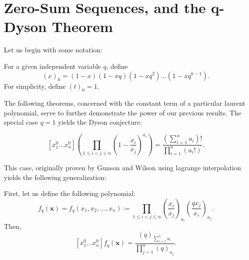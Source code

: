 \section{Zero-Sum Sequences, and the q-Dyson Theorem}
Let us begin with some notation:
\begin{notation}[Subpower]
	For a given independent variable $q$, define \[
		\left( x \right) _{k} = \left( 1-x \right) \left(  1-xq \right) \left( 1-xq^2 \right) \ldots \left( 1-xq^{k-1} \right)
	.\] 	For simplicity, define $\left( t \right) _{0} = 1$.
\end{notation}
The following theorems, concerned with the constant term of a particular laurent polynomial, serve to further demonstrate the power of our previous results. The special case $q=1$ yields the Dyson conjecture:
\begin{theorem}
	\[
		[x_1^{0}\ldots x_{n}^{0}]\left( \prod_{1\le i < j \le n}^{}  \left( 1- \frac{x_{i}}{x_{j}} \right)^{a_{i}}  \right)  = \frac{\left( \sum_{i= 1}^{n} a_{i} \right) ! }{\prod_{i= 1}^{n} \left( a_{i}! \right)}
	.\]
\end{theorem}
This case, originally proven by Gunson and Wilson using lagrange interpolation yields the following generalization:
\begin{theorem}
	First, let us define the following polynomial:
	\[
		f_{q}\left( \textbf{x} \right) = f_{q}\left( x_1, x_2, \ldots, x_{n} \right) \coloneqq \prod_{1\le i < j \le n}^{} \left( \frac{x_{i}}{x_{j}} \right) _{a_{i}} \left( \frac{qx_{j}}{x_{i}} \right) _{a_{j}}
	.\]
	Then,  \[
		[x_1^{0}\ldots x_{n}^{0}]f_{q}\left( \textbf{x} \right)  = \frac{\left( q \right) _{\sum_{i= 1}^{n} a_{i}}}{\prod_{j= 1}^{n} \left( q \right) _{a_{j}}}
	.\]
\end{theorem}

